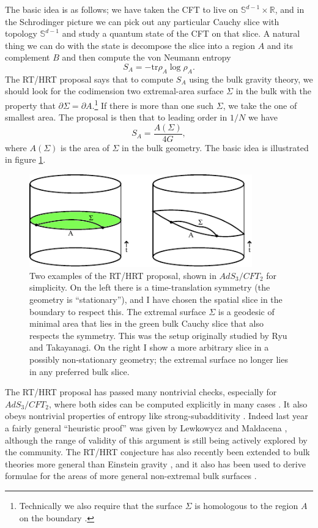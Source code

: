 \documentclass[12pt]{article}
\newcommand{\be}{\begin{equation}}
\newcommand{\ee}{\end{equation}}
\newcommand{\tr}{\mathrm{tr}}
\begin{document}
The basic idea is as follows; we have taken the CFT to live on $\mathbb{S}^{d-1}\times \mathbb{R}$, and in the Schrodinger picture we can pick out any particular Cauchy slice with topology $\mathbb{S}^{d-1}$ and study a quantum state of the CFT on that slice.  A natural thing we can do with the state is decompose the slice into a region $A$ and its complement $B$ and then compute the von Neumann entropy
\be
S_A=-\tr \rho_A \log \rho_A.
\ee 
The RT/HRT proposal says that to compute $S_A$ using the bulk gravity theory, we should look for the codimension two extremal-area surface $\Sigma$ in the bulk with the property that $\partial\Sigma=\partial A$.\footnote{Technically we also require that the surface $\Sigma$ is homologous to the region $A$ on the boundary \cite{Headrick:2007km}.}  If there is more than one such $\Sigma$, we take the one of smallest area.  The proposal is then that to leading order in $1/N$ we have
\be
S_A=\frac{A(\Sigma)}{4G},
\ee
where $A(\Sigma)$ is the area of $\Sigma$ in the bulk geometry.  The basic idea is illustrated in figure \ref{hrt}.  

\begin{figure}
\begin{center}
\includegraphics[height=4cm]{hrt.pdf}
\caption{Two examples of the RT/HRT proposal, shown in $AdS_3/CFT_2$ for simplicity.  On the left there is a time-translation symmetry (the geometry is ``stationary''), and I have chosen the spatial slice in the boundary to respect this.  The extremal surface $\Sigma$ is a geodesic of minimal area that lies in the green bulk Cauchy slice that also respects the symmetry.  This was the setup originally studied by Ryu and Takayanagi.  On the right I show a more arbitrary slice in a possibly non-stationary geometry; the extremal surface no longer lies in any preferred bulk slice.}\label{hrt}
\end{center}
\end{figure}
The RT/HRT proposal has passed many nontrivial checks, especially for $AdS_{3}/CFT_2$, where both sides can be computed explicitly in many cases \cite{Hartman:2013mia,Faulkner:2013yia}.  It also obeys nontrivial properties of entropy like strong-subadditivity \cite{Headrick:2007km,Wall:2012uf}.  Indeed last year a fairly general ``heuristic proof'' was given by Lewkowycz and Maldacena \cite{Lewkowycz:2013nqa}, although the range of validity of this argument is still being actively explored by the community.  The RT/HRT conjecture has also recently been extended to bulk theories more general than Einstein gravity \cite{Dong:2013qoa}, and it also has been used to derive formulae for the areas of more general non-extremal bulk surfaces \cite{Balasubramanian:2013lsa,Czech:2014wka}.  
\end{document}
